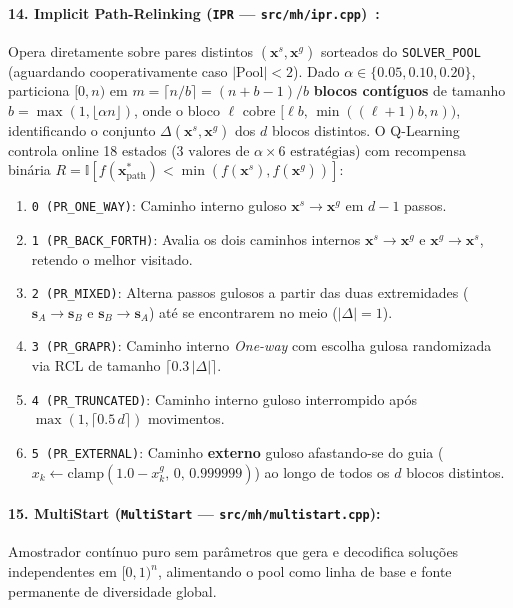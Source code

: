 \documentclass[11pt,a4paper]{article}
\begin{document}
\paragraph{14. Implicit Path-Relinking (\texttt{IPR} --- \texttt{src/mh/ipr.cpp})~\cite{glover1989tabu}:}
Opera diretamente sobre pares distintos $(\mathbf{x}^s, \mathbf{x}^g)$ sorteados do \texttt{SOLVER\_POOL} (aguardando cooperativamente caso $|\text{Pool}| < 2$). Dado $\alpha \in \{0.05, 0.10, 0.20\}$, particiona $[0, n)$ em $m = \lceil n/b \rceil = (n + b - 1)/b$ \textbf{blocos contíguos} de tamanho $b = \max(1, \lfloor \alpha n \rfloor)$, onde o bloco $\ell$ cobre $[\ell b,\, \min((\ell+1)b, n))$, identificando o conjunto $\Delta(\mathbf{x}^s, \mathbf{x}^g)$ dos $d$ blocos distintos. O Q-Learning controla online 18 estados ($3\text{ valores de }\alpha \times 6\text{ estratégias}$) com recompensa binária $R = \mathbb{I}[f(\mathbf{x}^*_{\text{path}}) < \min(f(\mathbf{x}^s), f(\mathbf{x}^g))]$:
\begin{enumerate}[leftmargin=*, nosep]
  \item \texttt{0 (PR\_ONE\_WAY)}: Caminho interno guloso $\mathbf{x}^s \to \mathbf{x}^g$ em $d-1$ passos.
  \item \texttt{1 (PR\_BACK\_FORTH)}: Avalia os dois caminhos internos $\mathbf{x}^s \to \mathbf{x}^g$ e $\mathbf{x}^g \to \mathbf{x}^s$, retendo o melhor visitado.
  \item \texttt{2 (PR\_MIXED)}: Alterna passos gulosos a partir das duas extremidades ($\mathbf{s}_A \to \mathbf{s}_B$ e $\mathbf{s}_B \to \mathbf{s}_A$) até se encontrarem no meio ($|\Delta| = 1$).
  \item \texttt{3 (PR\_GRAPR)}: Caminho interno \emph{One-way} com escolha gulosa randomizada via RCL de tamanho $\lceil 0.3\,|\Delta| \rceil$.
  \item \texttt{4 (PR\_TRUNCATED)}: Caminho interno guloso interrompido após $\max(1, \lceil 0.5\, d \rceil)$ movimentos.
  \item \texttt{5 (PR\_EXTERNAL)}: Caminho \textbf{externo} guloso afastando-se do guia ($x_k \leftarrow \text{clamp}(1.0 - x^g_k,\, 0,\, 0.999999)$) ao longo de todos os $d$ blocos distintos.
\end{enumerate}

\paragraph{15. MultiStart (\texttt{MultiStart} --- \texttt{src/mh/multistart.cpp}):}
Amostrador contínuo puro sem parâmetros que gera e decodifica soluções independentes em $[0,1)^n$, alimentando o pool como linha de base e fonte permanente de diversidade global.
\end{document}
